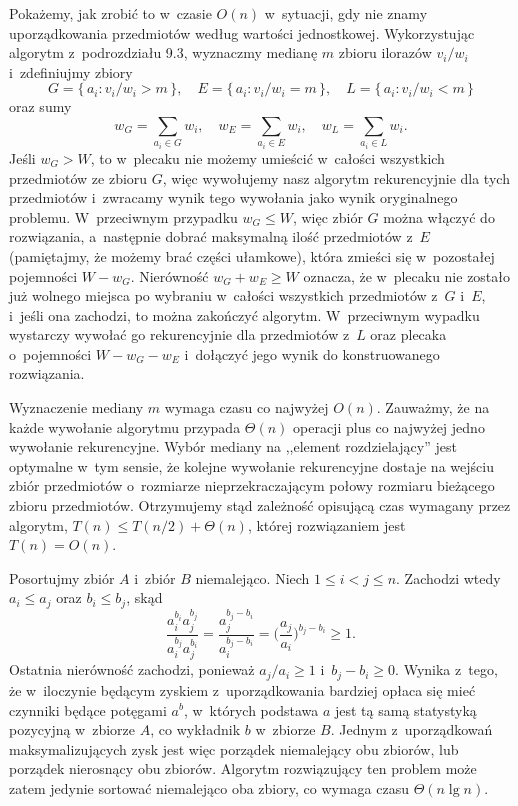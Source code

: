 Pokażemy, jak zrobić to w~czasie $O(n)$ w~sytuacji, gdy nie znamy uporządkowania przedmiotów według wartości jednostkowej.
Wykorzystując algorytm  z~podrozdziału 9.3, wyznaczmy medianę $m$ zbioru ilorazów $v_i/w_i$ i~zdefiniujmy zbiory
\[
	G = \{\,a_i:v_i/w_i>m\,\}, \quad E = \{\,a_i:v_i/w_i=m\,\}, \quad L = \{\,a_i:v_i/w_i<m\,\}
\]
oraz sumy
\[
	w_G = \sum_{a_i\in G}w_i, \quad w_E = \sum_{a_i\in E}w_i, \quad w_L = \sum_{a_i\in L}w_i.
\]
Jeśli $w_G>W$, to w~plecaku nie możemy umieścić w~całości wszystkich przedmiotów ze zbioru $G$, więc wywołujemy nasz algorytm rekurencyjnie dla tych przedmiotów i~zwracamy wynik tego wywołania jako wynik oryginalnego problemu.
W~przeciwnym przypadku $w_G\le W$, więc zbiór $G$ można włączyć do rozwiązania, a~następnie dobrać maksymalną ilość przedmiotów z~$E$ (pamiętajmy, że możemy brać części ułamkowe), która zmieści się w~pozostałej pojemności $W-w_G$.
Nierówność $w_G+w_E\ge W$ oznacza, że w~plecaku nie zostało już wolnego miejsca po wybraniu w~całości wszystkich przedmiotów z~$G$ i~$E$, i~jeśli ona zachodzi, to można zakończyć algorytm.
W~przeciwnym wypadku wystarczy wywołać go rekurencyjnie dla przedmiotów z~$L$ oraz plecaka o~pojemności $W-w_G-w_E$ i~dołączyć jego wynik do konstruowanego rozwiązania.

Wyznaczenie mediany $m$ wymaga czasu co najwyżej $O(n)$.
Zauważmy, że na każde wywołanie algorytmu przypada $\Theta(n)$ operacji plus co najwyżej jedno wywołanie rekurencyjne.
Wybór mediany na ,,element rozdzielający'' jest optymalne w~tym sensie, że kolejne wywołanie rekurencyjne dostaje na wejściu zbiór przedmiotów o~rozmiarze nieprzekraczającym połowy rozmiaru bieżącego zbioru przedmiotów.
Otrzymujemy stąd zależność opisującą czas wymagany przez algorytm, $T(n)\le T(n/2)+\Theta(n)$, której rozwiązaniem jest $T(n)=O(n)$.

\exercise %
Posortujmy zbiór $A$ i~zbiór $B$ niemalejąco.
Niech $1\le i<j\le n$.
Zachodzi wtedy $a_i\le a_j$ oraz $b_i\le b_j$, skąd
\[
	\frac{a_i^{b_i}a_j^{b_j}}{a_i^{b_j}a_j^{b_i}} = \frac{a_j^{b_j-b_i}}{a_i^{b_j-b_i}} = \biggl(\frac{a_j}{a_i}\biggr)^{b_j-b_i} \ge 1.
\]
Ostatnia nierówność zachodzi, ponieważ $a_j/a_i\ge1$ i~$b_j-b_i\ge0$.
Wynika z~tego, że w~iloczynie będącym zyskiem z~uporządkowania bardziej opłaca się mieć czynniki będące potęgami $a^b$, w~których podstawa $a$ jest tą samą statystyką pozycyjną w~zbiorze $A$, co wykładnik $b$ w~zbiorze $B$.
Jednym z~uporządkowań maksymalizujących zysk jest więc porządek niemalejący obu zbiorów, lub porządek nierosnący obu zbiorów.
Algorytm rozwiązujący ten problem może zatem jedynie sortować niemalejąco oba zbiory, co wymaga czasu $\Theta(n\lg n)$.
